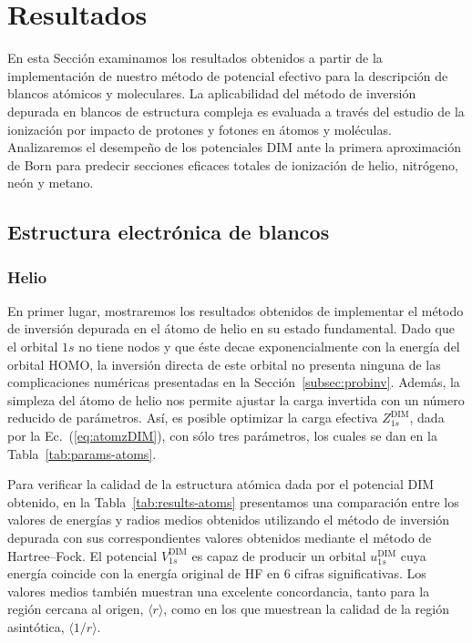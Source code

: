 \section{Resultados}
\label{sec:dimresultados}

En esta Sección examinamos los resultados obtenidos a partir de la 
implementación de nuestro método de potencial efectivo para la 
descripción de blancos atómicos y moleculares. La aplicabilidad del 
método de inversión depurada en blancos de estructura compleja es 
evaluada a través del estudio de la ionización por impacto de protones y 
fotones en átomos y moléculas. Analizaremos el desempeño de los  
potenciales DIM ante la primera aproximación de Born para predecir 
secciones eficaces totales de ionización de helio, nitrógeno, neón y 
metano.

\subsection{Estructura electrónica de blancos}
\label{subsec:dimtarget}

\subsubsection*{Helio}

En primer lugar, mostraremos los resultados obtenidos de implementar
el método de inversión depurada en el átomo de helio en su estado
fundamental. Dado que el orbital $1s$ no tiene nodos y que éste 
decae exponencialmente con la energía del orbital HOMO, la inversión 
directa de este orbital no presenta ninguna de las complicaciones 
numéricas presentadas en la Sección~\ref{subsec:probinv}. Además, la 
simpleza del átomo de helio nos permite ajustar la carga invertida con 
un número reducido de parámetros. Así, es posible optimizar la carga 
efectiva $Z_{1s}^{\mathrm{ DIM}}$, dada por la Ec.~(\ref{eq:atomzDIM}), 
con sólo tres parámetros, los cuales se dan en la 
Tabla~\ref{tab:params-atoms}.

Para verificar la calidad de la estructura atómica dada por el potencial 
DIM obtenido, en la Tabla~\ref{tab:results-atoms} presentamos una 
comparación entre los valores de energías y radios medios obtenidos 
utilizando el método de inversión depurada con sus correspondientes 
valores obtenidos mediante el método de Hartree--Fock. El potencial 
$V_{1s}^{\mathrm{ DIM}}$ es capaz de producir un orbital 
$u_{1s}^{\mathrm{ DIM}}$ cuya energía coincide con la energía original 
de HF en 6 cifras significativas. Los valores medios también muestran 
una excelente concordancia, tanto para la región cercana al origen, 
$\langle r \rangle$, como en los que muestrean la calidad de la región 
asintótica, $\langle 1/r\rangle$.


